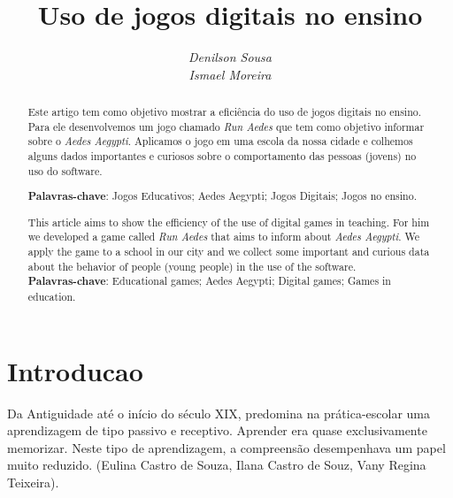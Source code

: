 \documentclass[12pt]{article}
\begin{document}
	
	\title{\textbf{Uso de jogos digitais no ensino}}
	\author{\textit{Denilson Sousa}\\\textit{Ismael Moreira}}
	
	\maketitle %

	\begin{abstract}
		Este artigo tem como objetivo mostrar a eficiência do uso de jogos digitais no ensino. Para ele desenvolvemos um jogo chamado \textit{Run Aedes} que tem como objetivo informar sobre o \textit{Aedes Aegypti}. Aplicamos o jogo em uma escola da nossa cidade e colhemos alguns dados importantes e curiosos sobre o comportamento das pessoas (jovens) no uso do software.
	
		\textbf{Palavras-chave}: Jogos Educativos; Aedes Aegypti; Jogos Digitais;  Jogos no ensino.	
	\end{abstract}


	\begin{abstract}
		This article aims to show the efficiency of the use of digital games in teaching. For him we developed a game called \textit {Run Aedes} that aims to inform about \textit {Aedes Aegypti}. We apply the game to a school in our city and we collect some important and curious data about the behavior of people (young people) in the use of the software. \\
			
		\textbf{Palavras-chave}: Educational games; Aedes Aegypti; Digital games; Games in education.	
	\end{abstract}
	
	
			
			
	\section{Introducao}%
	
	Da Antiguidade até o início do século XIX, predomina na prática-escolar uma aprendizagem de tipo passivo e receptivo. Aprender era quase exclusivamente memorizar. Neste tipo de aprendizagem, a compreensão desempenhava um papel muito reduzido. (Eulina Castro de Souza, Ilana Castro de Souz, Vany Regina Teixeira).\\
	
\end{document}
